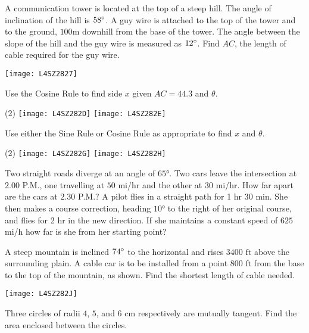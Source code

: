 \begin{Exercise}[title={Applications},label=exApplications]
\begin{multicols}{2}
	\Question A communication tower is located at the top of a steep hill. The angle of inclination
	of the hill is $58 \mbox{{\ensuremath{{}^\circ}}}$. A guy wire is attached to the top of the tower and to the ground, $100 \mbox{m}$ downhill from the base of the tower. The angle between the slope of the hill and the guy wire is measured as $12 \mbox{{\ensuremath{{}^\circ}}}$. Find $A C$, the length of cable required for the guy wire. %
	\columnbreak 
	
	\texttt{[image: L4SZ2827]}	\\
\end{multicols}	
\Question Use the Cosine Rule to find side $x$ given $AC=44.3$ and $\theta$. 
\begin{tasks}(2)
	\task 	\texttt{[image: L4SZ282D]}%
	\task 	\texttt{[image: L4SZ282E]}%
\end{tasks}
\Question Use either the Sine Rule or Cosine Rule as appropriate to find $x$ and $\theta$.
	\begin{tasks}(2)
		\task 	\texttt{[image: L4SZ282G]}%
		\task 	\texttt{[image: L4SZ282H]}%
	\end{tasks}
\Question Two straight roads diverge at an angle of $\ang{65}$. Two cars leave the intersection at $2.00$ P.M., one travelling at $50$ mi/hr and the other at $30$ mi/hr. How far apart are the cars at $2.30$ P.M.?%
\Question A pilot flies in a straight path for 1 hr 30 min. She then makes a course correction, heading $\ang{10}$ to the right of her original course, and flies for 2 hr in the new direction. If she maintains a constant speed of $625$ mi/h how far is she from her starting point?%

\begin{multicols}{2}
	\Question A steep mountain is inclined $74 \mbox{{\ensuremath{{}^\circ}}}$ to the horizontal and rises $3400 \mbox{ ft}$ above the surrounding plain. A cable car is to be installed from a point $800 \mbox{ ft}$ from the base to the top of the mountain, as shown. Find the shortest length of cable needed.%
	\columnbreak 
	
	\texttt{[image: L4SZ282J]}	\\
\end{multicols}	

\begin{multicols}{2}
	\Question Three circles of radii $4$, $5$, and $6 \mbox{ cm}$ respectively are mutually tangent. Find the area enclosed between the circles.%
	\columnbreak 
	

\end{multicols}
\end{Exercise}
